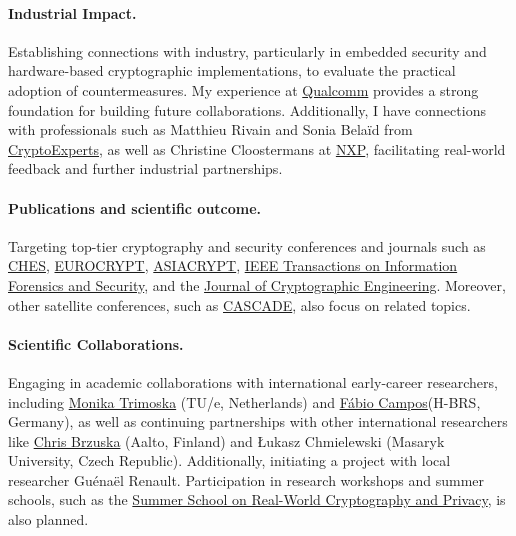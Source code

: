 \documentclass[11pt, a4paper]{article}
\begin{document}
\paragraph{Industrial Impact.} Establishing connections with industry, 
particularly in embedded security and hardware-based cryptographic 
implementations, to evaluate the practical adoption of countermeasures. 
My experience at \href{https://www.qualcomm.com/}{Qualcomm} provides a 
strong foundation for building future collaborations. Additionally, I 
have connections with professionals such as Matthieu Rivain and Sonia 
Belaïd from \href{https://www.cryptoexperts.com/people/}{CryptoExperts}, 
as well as Christine Cloostermans at 
\href{https://www.nxp.com/company/about-nxp/smarter-world-blog/BL-EMBRACING-EQUITY-ON-EVERY-LEVEL}{NXP}, 
facilitating real-world feedback and further industrial partnerships.

\paragraph{Publications and scientific outcome.} Targeting top-tier cryptography and security conferences and journals such as 
\href{https://ches.iacr.org/index.php}{CHES}, \href{https://eurocrypt.iacr.org/}{EUROCRYPT}, 
\href{https://asiacrypt.iacr.org/}{ASIACRYPT}, 
\href{https://ieeexplore.ieee.org/xpl/RecentIssue.jsp?punumber=10206}{IEEE Transactions on Information Forensics and Security}, 
and the \href{https://link.springer.com/journal/13389}{Journal of Cryptographic Engineering}. Moreover, other satellite 
conferences, such as \href{https://cascade-conference.org/cfp.html}{CASCADE}, also 
focus on related topics.

\paragraph{Scientific Collaborations.} Engaging in academic collaborations with international 
early-career researchers, including \href{https://mtrimoska.com/}{Monika Trimoska} (TU/e, Netherlands) and 
\href{https://www.sopmac.de/index.html}{Fábio Campos}(H-BRS, Germany), as well as continuing partnerships 
with other international researchers like \href{https://research.aalto.fi/en/persons/chris-brzuska}{Chris Brzuska} (Aalto, Finland) 
and Łukasz Chmielewski (Masaryk University, Czech Republic). Additionally, initiating a project with local researcher Guénaël Renault. 
Participation in research workshops and summer schools, such as the 
\href{https://summerschool-croatia.cs.ru.nl/}{Summer School on Real-World Cryptography and Privacy}, 
is also planned.
\end{document}
